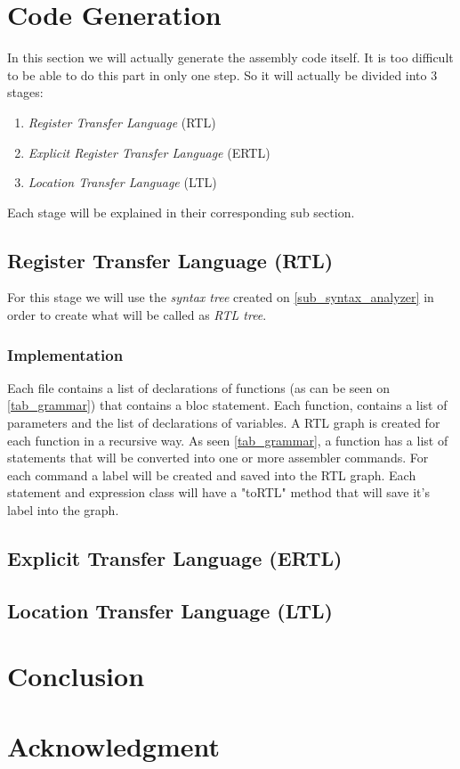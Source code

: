 \documentclass[conference]{IEEEtran}
\begin{document}
\section{Code Generation}
In this section we will actually generate the assembly code itself. 
It is too difficult to be able to do this part in only one step. So it will actually be divided into 3 stages:
\begin{enumerate}
	\item \textit{Register Transfer Language} (RTL)
	\item \textit{Explicit Register Transfer Language} (ERTL)
	\item \textit{Location Transfer Language} (LTL)
\end{enumerate}
Each stage will be explained in their corresponding sub section.

\subsection{Register Transfer Language (RTL)}
For this stage we will use the \textit{syntax tree} created on \ref{sub_syntax_analyzer} in order to create what will be called as \textit{RTL tree}.

\subsubsection{Implementation}
Each file contains a list of declarations of functions (as can be seen on \ref{tab_grammar}) that contains a bloc statement. Each function, contains a list of parameters and the list of declarations of variables.
A RTL graph is created for each function in a recursive way. As seen \ref{tab_grammar}, a function has a list of statements that will be converted into one or more assembler commands. For each command a label will be created and saved into the RTL graph. Each statement and expression class will have a "toRTL" method that will save it's label into the graph.

\subsection{Explicit Transfer Language (ERTL)}
\subsection{Location Transfer Language (LTL)}
\section{Conclusion}

\section*{Acknowledgment}

\newpage
{}


\end{document}
